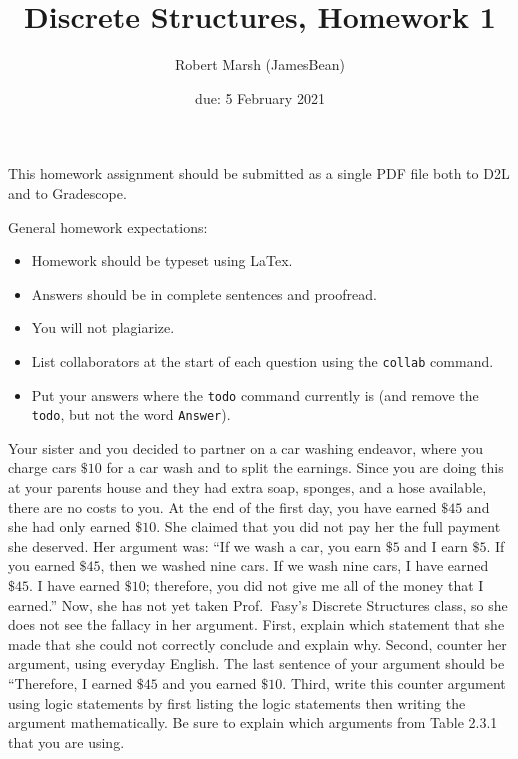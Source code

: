 \documentclass{article}
\title{Discrete Structures, Homework 1}
\author {Robert Marsh (JamesBean)}
\date{due: 5 February 2021}
\begin{document}
\maketitle

This homework assignment should be
submitted as a single PDF file both to D2L and to Gradescope.

General homework expectations:
\begin{itemize}
    \item Homework should be typeset using LaTex.
    \item Answers should be in complete sentences and proofread.
    \item You will not plagiarize.  \item List collaborators at the start of each question using the \texttt{collab} command.
    \item Put your answers where the \texttt{todo} command currently is (and
        remove the \texttt{todo}, but not the word \texttt{Answer}).
\end{itemize}

 
Your sister and you decided to partner on a car washing endeavor, where you
charge cars $\$10$ for a car wash and to split the earnings.  Since you are
doing this at your parents house and they had extra soap, sponges, and a hose
available, there are no costs to you.  At the end of the first day, you have
earned $\$45$ and she had only earned $\$10$. She claimed that you did not pay
her the full payment she deserved. Her argument was: ``If we wash a car, you
earn $\$5$ and I earn $\$5$.  If you earned $\$45$, then we washed nine cars.  If
we wash nine cars, I have earned $\$45$.  I have earned $\$10$; therefore, you
did not give me all of the money that I earned.''  Now, she has not yet taken
Prof.~Fasy's Discrete Structures class, so she does not see the fallacy in her
argument. First, explain which statement that she made that she could not
correctly conclude and explain why.  Second, counter her argument, using
everyday English. The last sentence of your argument should be ``Therefore, I
earned $\$45$ and you earned $\$10$. Third, write this counter argument using
logic statements by first listing the logic statements then writing the argument
mathematically.  Be sure to explain which arguments from Table 2.3.1 that you
are using.
\end{document}

